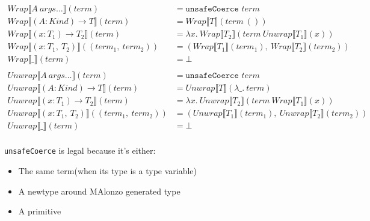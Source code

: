 \begin{align*}
   Wrap\llbracket A\ args\ldots \rrbracket(term) &= \texttt{unsafeCoerce } term\\
   Wrap\llbracket (A : Kind) \rightarrow T \rrbracket(term) &= Wrap\llbracket T \rrbracket(term\ ())\\
   Wrap\llbracket (x : T_1) \rightarrow T_2 \rrbracket(term) &=
      \lambda x.\ Wrap\llbracket T_2 \rrbracket(term\ Unwrap\llbracket T_1 \rrbracket(x))\\
   Wrap\llbracket (x : T_1,\ T_2) \rrbracket((term_1,\ term_2)) &=
      (Wrap\llbracket T_1 \rrbracket(term_1),\ Wrap\llbracket T_2 \rrbracket(term_2))\\
   Wrap\llbracket \_ \rrbracket(term) &= \bot\\
   \\
   Unwrap\llbracket A\ args\ldots \rrbracket(term) &= \texttt{unsafeCoerce } term\\
   Unwrap\llbracket (A : Kind) \rightarrow T \rrbracket(term) &= Unwrap\llbracket T \rrbracket(\lambda \_.\ term)\\
   Unwrap\llbracket (x : T_1) \rightarrow T_2 \rrbracket(term) &=
      \lambda x.\ Unwrap\llbracket T_2 \rrbracket(term\ Wrap\llbracket T_1 \rrbracket(x))\\
   Unwrap\llbracket (x : T_1,\ T_2) \rrbracket((term_1,\ term_2)) &=
      (Unwrap\llbracket T_1 \rrbracket(term_1),\ Unwrap\llbracket T_2 \rrbracket(term_2))\\
   Unwrap\llbracket \_ \rrbracket(term) &= \bot\\
\end{align*}

\texttt{unsafeCoerce} is legal because it's either:
\begin{itemize}
\item The same term(when its type is a type variable)
\item A newtype around MAlonzo generated type
\item A primitive
\end{itemize}
